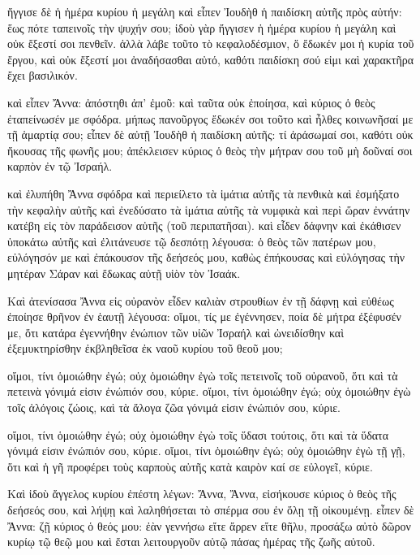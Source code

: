 \documentclass[12pt]{book} %
\begin{document}
\begin{pairs}
\begin{Leftside}
\pend\pstart
ἤγγισε δὲ ἡ ἡμέρα κυρίου ἡ μεγάλη καὶ εἶπεν Ἰουδὴθ ἡ παιδίσκη αὐτῆς πρὸς αὐτήν: ἕως πότε ταπεινοῖς τὴν ψυχήν σου; ἰδοὺ γὰρ ἤγγισεν ἡ ἡμέρα κυρίου ἡ μεγάλη καὶ οὐκ ἔξεστί σοι πενθεῖν. ἀλλὰ λάβε τοῦτο τὸ κεφαλο\-δέσμιον, ὅ ἔδωκέν μοι ἡ κυρία τοῦ ἔργου, καὶ οὐκ ἔξεστί μοι ἀναδήσασθαι αὐτό, καθότι παιδίσκη σού εἰμι καὶ χαρακτῆρα ἔχει βασιλικόν.

\pend\pstart
καὶ εἶπεν Ἄννα: ἀπόστηθι ἀπ' ἐμοῦ: καὶ ταῦτα οὐκ ἐποίησα, καὶ κύριος ὁ θεὸς ἐτα\-πείνωσέν με σφόδρα. μήπως πανοῦργος ἔδωκέν σοι τοῦτο καὶ ἦλθες κοινωνῆσαί με τῇ ἁμαρτίᾳ σου; εἶπεν δὲ αὐτῇ Ἰουδὴθ ἡ παιδίσκη αὐτῆς: τί ἀράσωμαί σοι, καθότι οὐκ ἤκουσας τῆς φωνῆς μου; ἀπέκλεισεν κύριος ὁ θεὸς τὴν μήτραν σου τοῦ μὴ δοῦναί σοι καρπὸν ἐν τῷ Ἰσραήλ.

\pend\pstart
καὶ ἐλυπήθη Ἄννα σφόδρα καὶ περιείλετο τὰ ἱμάτια αὐτῆς τὰ πενθικὰ καὶ ἐσμήξατο τὴν κεφαλὴν αὐτῆς καὶ ἐνεδύσατο τὰ ἱμάτια αὐτῆς τὰ νυμφικὰ καὶ περὶ ὥραν ἐννάτην κατέβη εἰς τὸν παράδεισον αὐτῆς (τοῦ περι\-πατῆσαι). καὶ εἶδεν δάφνην καὶ ἐκάθισεν ὑποκάτω αὐτῆς καὶ ἐλιτάνευσε τῷ δεσπότῃ λέγουσα: ὁ θεὸς τῶν πατέρων μου, εὐλόγησόν με καὶ ἐπάκουσον τῆς δεήσεός μου, καθὼς ἐπήκουσας καὶ εὐλόγησας τὴν μητέραν Σάραν καὶ ἔδωκας αὐτῇ υἱὸν τὸν Ἰσαάκ.

\pend\pstart
{}

\pend\pstart
Καὶ ἀτενίσασα Ἄννα εἰς οὐρανὸν εἶδεν καλιὰν στρουθίων ἐν τῇ δάφνῃ καὶ εὐθέως ἐποίησε θρῆνον ἐν ἑαυτῇ λέγουσα: οἴμοι, τίς με ἐγέννησεν, ποία δὲ μήτρα ἐξέφυσέν με, ὅτι κατάρα ἐγεννήθην ἐνώπιον τῶν υἱῶν Ἰσραήλ καὶ ὠνειδίσθην καὶ ἐξεμυκτηρίσθην ἐκβληθεῖσα ἐκ ναοῦ κυρίου τοῦ θεοῦ μου;

\pend\pstart
οἴμοι, τίνι ὁμοιώθην ἐγώ; οὐχ ὁμοιώθην ἐγὼ τοῖς πετεινοῖς τοῦ οὐρανοῦ, ὅτι καὶ τὰ πετεινὰ γόνιμά εἰσιν ἐνώπιόν σου, κύριε. οἴμοι, τίνι ὁμοιώθην ἐγώ; οὐχ ὁμοιώθην ἐγὼ τοῖς ἀλόγοις ζώοις, καὶ τὰ ἄλογα ζῶα γόνιμά εἰσιν ἐνώπιόν σου, κύριε.

\pend\pstart
οἴμοι, τίνι ὁμοιώθην ἐγώ; οὐχ ὁμοιώθην ἐγὼ τοῖς ὕδασι τούτοις, ὅτι καὶ τὰ ὕδατα γόνιμά εἰσιν ἐνώπιόν σου, κύριε. οἴμοι, τίνι ὁμοιώθην ἐγώ; οὐχ ὁμοιώθην ἐγὼ τῇ γῇ, ὅτι καὶ ἡ γῆ προφέρει τοὺς καρποὺς αὐτῆς κατὰ καιρὸν καί σε εὐλογεῖ, κύριε.

\pend\pstart
{}

\pend\pstart
Καὶ ἰδοὺ ἄγγελος κυρίου ἐπέστη λέγων: Ἄννα, Ἄννα, εἰσήκουσε κύριος ὁ θεὸς τῆς δεήσεός σου, καὶ λήψῃ καὶ λαληθήσεται τὸ σπέρμα σου ἐν ὅλῃ τῇ οἰκουμένῃ. εἶπεν δὲ Ἄννα: ζῇ κύριος ὁ θεός μου: ἐὰν γεννήσω εἴτε ἄρρεν εἴτε θῆλυ, προσάξω αὐτὸ δῶρον κυρίῳ τῷ θεῷ μου καὶ ἔσται λειτουργοῦν αὐτῷ πάσας ἡμέρας τῆς ζωῆς αὐτοῦ.


\end{Leftside}
\end{pairs}
\end{document}
